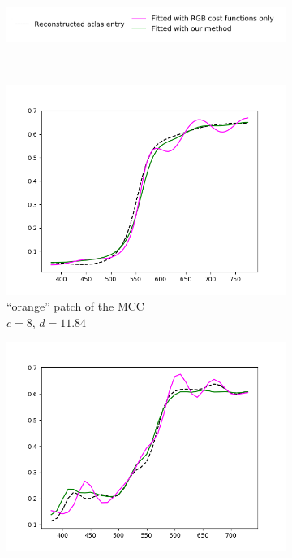 \begin{figure}[t]
	\centering
	\captionsetup[subfigure]{font=footnotesize,labelfont=footnotesize}
	\captionsetup[subfigure]{justification=centering}
	\begin{subfigure}[t]{0.70\textwidth}
		\includegraphics[width=\linewidth]{img/results_costFunctions_legend.png}
	\end{subfigure} \\
	\begin{subfigure}[t]{0.45\textwidth}
		\includegraphics[width=\linewidth]{img/results_costFunctions_orange.png}
		\caption{``orange'' patch of the MCC\\$c = 8$, $d = 11.84$}
		\label{fig:resultsCostFunctions_orange}
	\end{subfigure} \hspace{0.1em}
	\begin{subfigure}[t]{0.45\textwidth}
		\includegraphics[width=\linewidth]{img/results_costFunctions_mcb0706.png}

\end{subfigure}
\end{figure}
